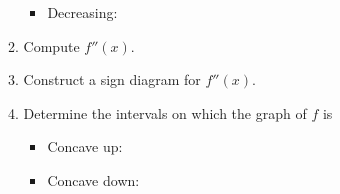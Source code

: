 \documentclass[12pt]{article}
\newcommand{\points}[1]{\marginpar{\hspace{24pt}[#1]}}
\begin{document}
\begin{enumerate}
\begin{enumerate}
\begin{itemize}
\vspace{1.2cm}

 \item Decreasing:

\vspace{1.2cm}
\end{itemize}

 \item Compute $f''(x)$.\points{1}

\vspace{0.5in}

 \item Construct a sign diagram for $f''(x)$. \points{1}

\vspace{1.1in}

 \item Determine the intervals on which the graph of $f$ is\points{2}
\begin{itemize}
 \item Concave up:

\vspace{1.2cm}

 \item Concave down:
\end{itemize}

\end{enumerate}

\end{enumerate}
\end{document}

